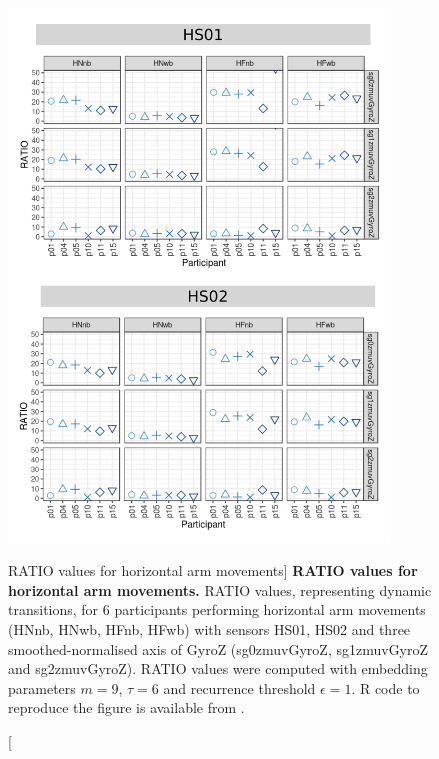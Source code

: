 \begin{figure}
\centering
\includegraphics[width=0.9\textwidth]{rqa_ratio_H_w500}
    \caption
	[RATIO values for horizontal arm movements]{
	{\bf RATIO values for horizontal arm movements.}	
	RATIO values, representing dynamic transitions, 
	for 6 participants performing horizontal arm movements 
	(HNnb, HNwb, HFnb, HFwb)
	with sensors HS01, HS02 and three smoothed-normalised axis 
	of GyroZ (sg0zmuvGyroZ, sg1zmuvGyroZ and sg2zmuvGyroZ).
	RATIO values were computed with 
	embedding parameters $m=9$, $\tau=6$ and recurrence threshold
	$\epsilon=1$.
	R code to reproduce the figure is available from \cite{xochicale2018}.
        }
    \label{fig:rqa_ratio_H}
\end{figure}
